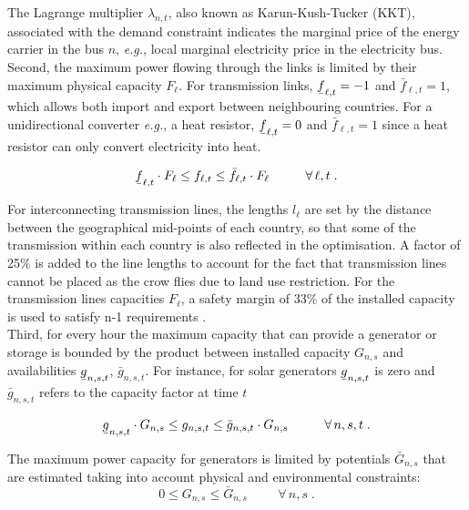 \documentclass[3p]{elsarticle} %
\newcommand{\ubar}[1]{\text{\b{$#1$}}}
\begin{document}
The Lagrange multiplier $\lambda_{n,t}$,  also known as Karun-Kush-Tucker (KKT),  associated with the demand constraint indicates the marginal price of the energy carrier in the bus $n$, \textit{e.g.}, local marginal electricity price in the electricity bus. \\

Second, the maximum power flowing through the links is limited by their maximum physical capacity $F_{\ell}$. For transmission links, $\ubar{f}_{\ell,t}=-1$ and $\bar{f}_{\ell,t}=1$, which allows both import and export between neighbouring countries. For a unidirectional converter \textit{e.g.}, a heat resistor, $\ubar{f}_{\ell,t}=0$ and $\bar{f}_{\ell,t}=1$ since a heat resistor can only convert electricity into heat.

\begin{equation}
\ubar{f}_{\ell,t} \cdot F_{\ell} \leq f_{\ell,t} \leq \bar{f}_{\ell,t} \cdot F_{\ell} \hspace{1cm} \forall\, \ell,t \; . \label{eq_links}
\end{equation}

For interconnecting transmission lines, the lengths $l_{\ell}$ are set by the distance between the geographical mid-points of each country, so that some of the transmission within each country is also reflected in the optimisation. A factor of 25\% is added to the line lengths to account for the fact that transmission lines cannot be placed as the crow flies due to land use restriction. For the transmission lines capacities $F_{\ell}$, a safety margin of 33\% of the installed capacity is used to satisfy n-1 requirements \cite{Brown_2016}. \\ %

Third, for every hour the maximum capacity that can provide a generator or storage is bounded by the product between installed capacity $G_{n,s}$ and availabilities $\ubar{g}_{n,s,t}$, $\bar{g}_{n,s,t}$. For instance, for solar generators $\ubar{g}_{n,s,t}$ is zero and $\bar{g}_{n,s,t}$ refers to the capacity factor at time $t$ 

\begin{equation}
\ubar{g}_{n,s,t} \cdot G_{n,s} \leq g_{n,s,t} \leq \bar{g}_{n,s,t} \cdot G_{n,s} \hspace{1cm} \forall\, n,s,t \; . \label{eq_g}
\end{equation}

The maximum power capacity for generators is limited by potentials $\bar{G}_{n,s}$ that are estimated taking into account physical and environmental constraints:
\begin{equation}\label{eq_max_G}
0 \leq G_{n,s}\leq \bar{G}_{n,s} \hspace{1cm} \forall\, n,s \; .
\end{equation}
\end{document}
